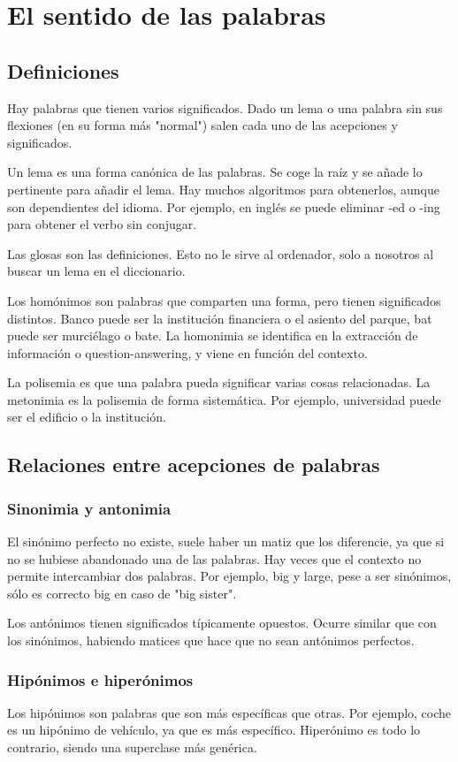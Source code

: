 \chapter{El sentido de las palabras}
\section{Definiciones}
Hay palabras que tienen varios significados. Dado un lema o una palabra sin sus flexiones (en su forma más "normal") salen cada uno de las acepciones y significados. 

Un lema es una forma canónica de las palabras. Se coge la raíz y se añade lo pertinente para añadir el lema. Hay muchos algoritmos para obtenerlos, aunque son dependientes del idioma. Por ejemplo, en inglés se puede eliminar -ed o -ing para obtener el verbo sin conjugar. 

Las glosas son las definiciones. Esto no le sirve al ordenador, solo a nosotros al buscar un lema en el diccionario. 

Los homónimos son palabras que comparten una forma, pero tienen significados distintos. Banco puede ser la institución financiera o el asiento del parque, bat puede ser murciélago o bate. La homonimia se identifica en la extracción de información o question-answering, y viene en función del contexto. 

La polisemia es que una palabra pueda significar varias cosas relacionadas. La metonimia es la polisemia de forma sistemática. Por ejemplo, universidad puede ser el edificio o la institución. 

\section{Relaciones entre acepciones de palabras}
\subsection{Sinonimia y antonimia}
El sinónimo perfecto no existe, suele haber un matiz que los diferencie, ya que si no se hubiese abandonado una de las palabras. Hay veces que el contexto no permite intercambiar dos palabras. Por ejemplo, big y large, pese a ser sinónimos, sólo es correcto big en caso de "big sister". 

Los antónimos tienen significados típicamente opuestos. Ocurre similar que con los sinónimos, habiendo matices que hace que no sean antónimos perfectos. 

\subsection{Hipónimos e hiperónimos}
Los hipónimos son palabras que son más específicas que otras. Por ejemplo, coche es un hipónimo de vehículo, ya que es más específico. Hiperónimo es todo lo contrario, siendo una superclase más genérica. 

